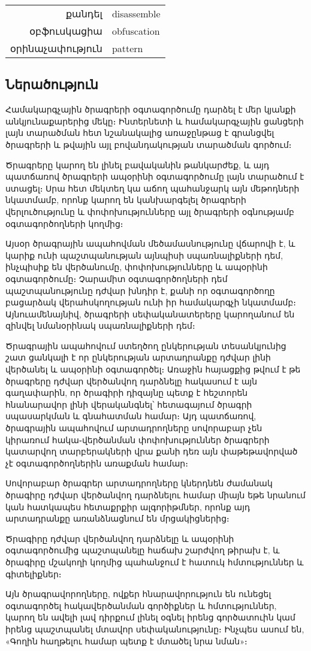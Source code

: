 \documentclass[12pt]{article}
\begin{document}
\begin{sloppypar}
\begin{tabular}{rl}
քանդել&disassemble \\
օբֆուսկացիա&obfuscation \\
օրինաչափություն&pattern \\
\end{tabular}

\subsection{Ներածություն}
Համակարգչային ծրագրերի օգտագործումը դարձել է մեր կյանքի անկյունաքարերից մեկը։
Ինտերնետի և համակարգչային ցանցերի լայն տարածման հետ նշանակալից առաջընթաց է
գրանցվել ծրագրերի և թվային այլ բովանդակության տարածման գործում։

Ծրագրերը կարող են լինել բավականին թանկարժեք, և այդ պատճառով ծրագրերի ապօրինի
օգտագործումը լայն տարածում է ստացել։ Սրա հետ մեկտեղ կա աճող պահանջարկ այն
մեթոդների նկատմամբ, որոնք կարող են կանխարգելել ծրագրերի վերլուծությունը և
փոփոխությունները այլ ծրագրերի օգնությամբ օգտագործողների կողմից։

Այսօր ծրագրային ապահովման մեծամասնությունը վճարովի է, և կարիք ունի
պաշտպանության այնպիսի սպառնալիքների դեմ, ինչպիսիք են վերծանումը,
փոփոխությունները և ապօրինի օգտագործումը։ Չարամիտ օգտագործողների դեմ պաշտպանությունը
դժվար խնդիր է, քանի որ օգտագործողը բացարձակ վերահսկողության ունի իր համակարգչի
նկատմամբ։
Այնուամենայնիվ, ծրագրերի սեփականատերերը կարողանում են զինվել նմանօրինակ
սպառնալիքների դեմ։

Ծրագրային ապահովում ստեղծող ընկերության տեսանկյունից շատ ցանկալի է որ
ընկերության արտադրանքը դժվար լինի վերծանել և ապօրինի օգտագործել։
Առաջին հայացքից թվում է թե ծրագրերը դժվար վերծանվող դարձնելը հակասում է այն
գաղափարին, որ ծրագիրի դիզայնը պետք է հեշտորեն հնանարավոր լինի
վերականգնել՝ հետագայում ծրագրի սպասարկման և գնահատման համար։
Այդ պատճառով, ծրագրային ապահովում արտադրողները սովորաբար չեն կիրառում
հակա֊վերծանման փոփոխություններ ծրագրերի կատարվող տարբերակների վրա քանի դեռ
այն փաթեթավորված չէ օգտագործողներին առաքման համար։

Սովորաբար ծրագրեր արտադրողները կներդնեն ժամանակ ծրագիրը դժվար վերծանվող
դարձնելու համար միայն եթե նրանում կան հատկապես հետաքրքիր ալգորիթմներ,
որոնք այդ արտադրանքը առանձնացնում են մրցակիցներից։

Ծրագիրը դժվար վերծանվող դարձնելը և ապօրինի օգտագործումից պաշտպանելը հաճախ
շարժվող թիրախ է, և ծրագիրը մշակողի կողմից պահանջում է հատուկ հմտություններ և
գիտելիքներ։

Այն ծրագրավորողները, ովքեր հնարավորություն են ունեցել օգտագործել հակավերծանման
գործիքներ և հմտություններ, կարող են ավելի լավ դիրքում լինել օգնել իրենց գործատուին
կամ իրենց պաշտպանել մտավոր սեփականությունը։ Ինչպես ասում են, «Գողին հաղթելու
համար պետք է մտածել նրա նման»։


\end{sloppypar}
\end{document}

